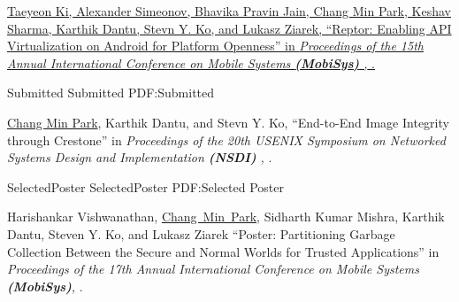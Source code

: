\documentclass[letterpaper,MMMyyyy,nonstopmode]{simpleresumecv}
\begin{document}
\begin{Body}
\Gap
\vspace{0.5ex}
\NumberedItem{[4]}
\href{https://dl.acm.org/citation.cfm?id=3081341}
{Taeyeon Ki, Alexander Simeonov, Bhavika Pravin Jain, \underline{Chang Min Park},
Keshav Sharma, Karthik Dantu, Stevn Y. Ko, and Lukasz Ziarek, 
``Reptor: Enabling API Virtualization on Android for Platform Openness'' in 
\textit{Proceedings of the 15th Annual International Conference on Mobile Systems \textbf{(MobiSys)}
, }.}


\vspace{1ex}

\SubSection
{Submitted}
{Submitted}
{PDF:Submitted}

\begingroup
\renewcommand{\MaxNumberedItem}{[88]}

\Gap
\NumberedItem{[1]}
{\underline{Chang Min Park}, Karthik Dantu, and Stevn Y. Ko,
``End-to-End Image Integrity through Crestone'' in
\textit{Proceedings of the 20th USENIX Symposium on Networked Systems Design and Implementation \textbf{(NSDI)}
, }.}




\vspace{0ex}
\Section
{Selected\newline Poster}
{Selected\newline Poster}
{PDF:Selected Poster}



\begingroup
\renewcommand{\MaxNumberedItem}{[88]}

\BigGap
\BulletItem
Harishankar Vishwanathan, \underline{Chang~Min~Park}, Sidharth Kumar Mishra, Karthik Dantu, 
Steven Y. Ko, and Lukasz Ziarek
``Poster: Partitioning Garbage Collection Between the Secure and Normal Worlds for Trusted Applications'' in
\textit{Proceedings of the 17th Annual International Conference on Mobile Systems \textbf{(MobiSys)},
}.





\end{Body}
\end{document}
